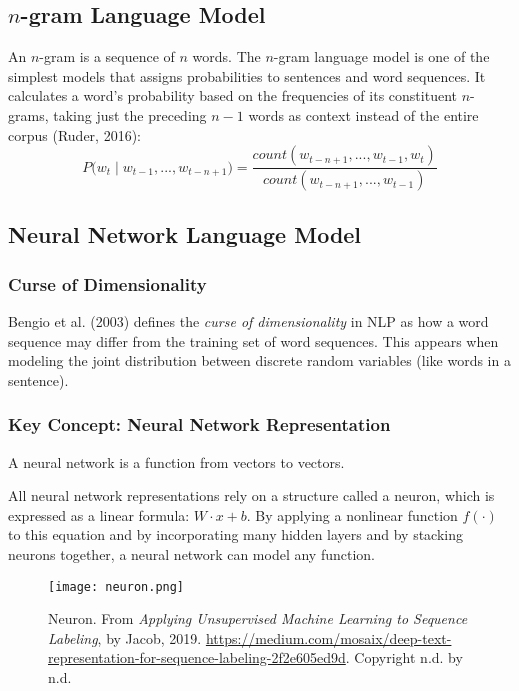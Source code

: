 \subsection{$n$-gram Language Model}

An $n$-gram is a sequence of $n$ words. The $n$-gram language model is one of the simplest models that assigns probabilities to sentences and word sequences. It calculates a word's probability based on the frequencies of its constituent $n$-grams, taking just the preceding $n-1$ words as context instead of the entire corpus (Ruder, 2016): 
$$
P \Big(w_t \; | \; w_{t-1}, ..., w_{t-n+1} \Big) = \frac {count(w_{t-n+1},...,w_{t-1},w_t)} {count(w_{t-n+1},...,w_{t-1})}
$$

\subsection{Neural Network Language Model}

\subsubsection{Curse of Dimensionality}

Bengio et al. (2003) defines the \emph{curse of dimensionality} in NLP as how a word sequence may differ from the training set of word sequences. This appears when modeling the joint distribution between discrete random variables (like words in a sentence). 

\subsubsection{Key Concept: Neural Network Representation}

A neural network is a function from vectors to vectors. 

All neural network representations rely on a structure called a neuron, which is expressed as a linear formula: $W \cdot x + b$. By applying a nonlinear function $f(\cdot)$ to this equation and by incorporating many hidden layers and by stacking neurons together, a neural network can model any function. 

\begin{figure}[h]
\centering
\texttt{[image: neuron.png]}
\caption{Neuron. From \emph{Applying Unsupervised Machine Learning to Sequence Labeling}, by Jacob, 2019. \url{https://medium.com/mosaix/deep-text-representation-for-sequence-labeling-2f2e605ed9d}. Copyright n.d. by n.d.}
\end{figure}

